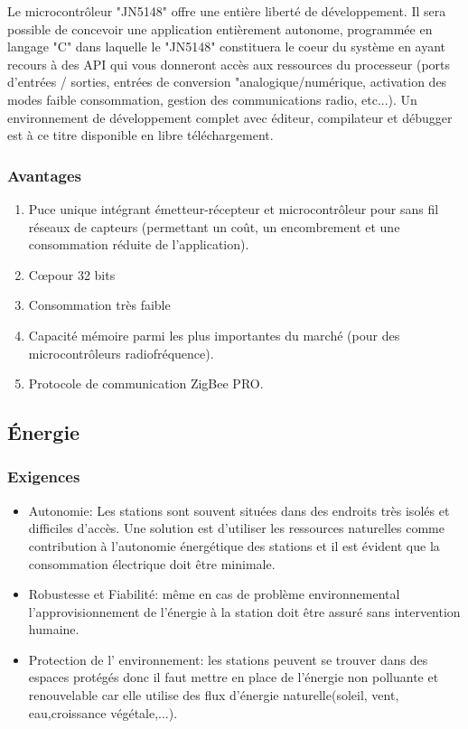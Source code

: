 Le microcontrôleur "JN5148" offre une entière liberté de développement. Il sera possible de concevoir une application entièrement autonome, programmée en langage "C" dans laquelle le "JN5148" constituera le coeur du système en ayant recours à des API qui vous donneront accès aux ressources du processeur (ports d'entrées / sorties, entrées de conversion "analogique/numérique, activation des modes faible consommation, gestion des communications radio, etc...). Un environnement de développement complet avec éditeur, compilateur et débugger est à ce titre disponible en libre téléchargement.

\subsubsection{Avantages}  

\begin{enumerate}
	\item  Puce unique intégrant émetteur-récepteur et microcontrôleur pour sans fil réseaux de capteurs (permettant un coût, un encombrement et une consommation réduite de l’application).
	\item Cœpour 32 bits
	\item Consommation très faible  
	\item Capacité mémoire parmi les plus importantes du marché (pour des microcontrôleurs radiofréquence).
	\item Protocole de communication ZigBee PRO.
\end{enumerate}

\subsection{Énergie}

\subsubsection{Exigences}
\begin{itemize}

\item Autonomie: Les stations sont souvent situées dans des endroits très isolés et difficiles d'accès. Une solution est d'utiliser les ressources naturelles comme contribution à l'autonomie énergétique des stations et il est évident que la consommation électrique doit être minimale.

\smallskip \item Robustesse et Fiabilité: même en cas de problème environnemental l'approvisionnement de l'énergie à la station doit être assuré sans intervention humaine.

\smallskip \item Protection de l' environnement: les stations peuvent se trouver dans des espaces protégés donc il faut mettre en place de l'énergie non polluante et renouvelable car elle utilise des flux d'énergie naturelle(soleil, vent, eau,croissance végétale,...).
\end{itemize}

